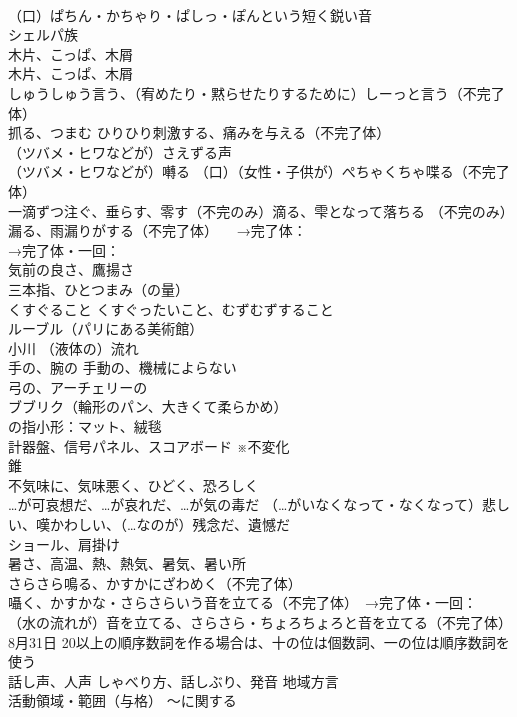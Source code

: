 \documentclass[8pt]{extreport}
\begin{document}
\begin{CJK}{UTF8}{min}
\\	（口）ぱちん・かちゃり・ぱしっ・ぽんという短く鋭い音
\\	シェルパ族
\\	木片、こっぱ、木屑
\\	木片、こっぱ、木屑
\\	しゅうしゅう言う、（宥めたり・黙らせたりするために）しーっと言う（不完了体）
\\	抓る、つまむ ひりひり刺激する、痛みを与える（不完了体）
\\	（ツバメ・ヒワなどが）さえずる声
\\	（ツバメ・ヒワなどが）囀る （口）（女性・子供が）ぺちゃくちゃ喋る（不完了体）
\\	一滴ずつ注ぐ、垂らす、零す（不完のみ）滴る、雫となって落ちる （不完のみ）漏る、雨漏りがする（不完了体） 　→完了体：
\\	→完了体・一回：
\\	気前の良さ、鷹揚さ
\\	三本指、ひとつまみ（の量）
\\	くすぐること くすぐったいこと、むずむずすること
\\	ルーブル（パリにある美術館）
\\	小川 （液体の）流れ
\\	手の、腕の 手動の、機械によらない
\\	弓の、アーチェリーの
\\	ブブリク（輪形のパン、大きくて柔らかめ）
\\	の指小形：マット、絨毯
\\	計器盤、信号パネル、スコアボード ※不変化
\\	錐
\\	不気味に、気味悪く、ひどく、恐ろしく
\\	[述]…が可哀想だ、…が哀れだ、…が気の毒だ （…がいなくなって・なくなって）悲しい、嘆かわしい、（…なのが）残念だ、遺憾だ
\\	ショール、肩掛け
\\	暑さ、高温、熱、熱気、暑気、暑い所
\\	さらさら鳴る、かすかにざわめく（不完了体）
\\	囁く、かすかな・さらさらいう音を立てる（不完了体）　→完了体・一回：
\\	（水の流れが）音を立てる、さらさら・ちょろちょろと音を立てる（不完了体）
\\	8月31日 20以上の順序数詞を作る場合は、十の位は個数詞、一の位は順序数詞を使う
\\	話し声、人声 しゃべり方、話しぶり、発音 地域方言
\\	活動領域・範囲（与格）	〜に関する

\end{CJK}
\end{document}
